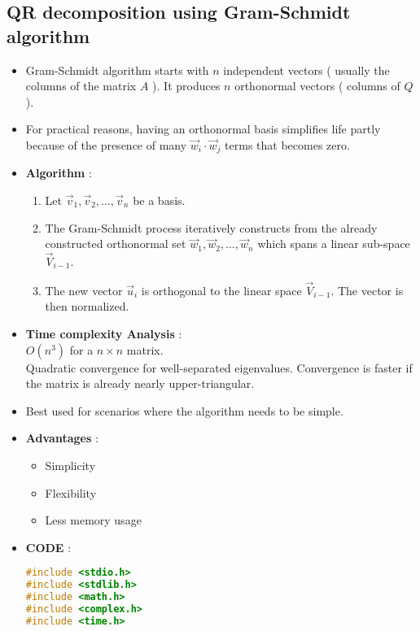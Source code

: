 \documentclass[report,12pt,onecolumn]{IEEEtran}
\theoremstyle{remark}
\begin{document}
\begin{itemize}
			\subsection{QR decomposition using Gram-Schmidt algorithm}
			\begin{itemize}
				\item Gram-Schmidt algorithm starts with $n$ independent vectors ( usually the columns of the matrix $A$ ). It produces $n$ orthonormal vectors ( columns of $Q$ ).
				\item For practical reasons, having an orthonormal basis simplifies life partly because of the presence of many $\vec{w}_i \cdot \vec{w}_j$ terms that becomes zero.
				\item \textbf{Algorithm} :\\
					\begin{enumerate}
						\item Let $\vec{v}_1, \vec{v}_2, \dots, \vec{v}_n$ be a basis. 
						\item The Gram-Schmidt process iteratively constructs from the already constructed orthonormal set $\vec{w}_1, \vec{w}_2, \dots, \vec{w}_n$ which spans a linear sub-space $\vec{V}_{i-1}$. 
						\item The new vector $\vec{u}_i$ is orthogonal to the linear space $\vec{V}_{i-1}$. The vector is then normalized.
					\end{enumerate}
				\item \textbf{Time complexity Analysis} : \\
					$O(n^3)$ for a $n \times n$ matrix. \\
					Quadratic convergence for well-separated eigenvalues. Convergence is faster if the matrix is already nearly upper-triangular.
				\item Best used for scenarios where the algorithm needs to be simple.
				\item \textbf{Advantages} : \\
					\begin{itemize}
						\item Simplicity
						\item Flexibility
						\item Less memory usage
					\end{itemize}
				\item \textbf{CODE} : \\
					\begin{lstlisting}[language = C]	
#include <stdio.h>
#include <stdlib.h>
#include <math.h>
#include <complex.h>
#include <time.h>



\end{lstlisting}
\end{itemize}
\end{itemize}
\end{document}

